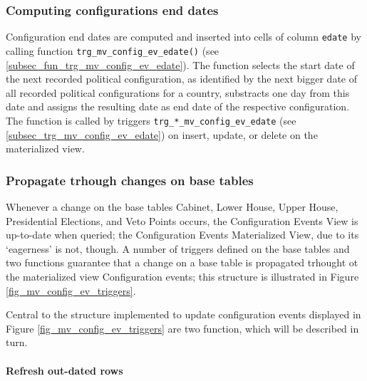 \subsubsection{Computing configurations end dates}
Configuration end dates are computed and inserted into cells of column \texttt{edate} by calling function \texttt{trg\_mv\_config\_ev\_edate()} (see \ref{subsec_fun_trg_mv_config_ev_edate}).
The function selects the start date of the next recorded political configuration, as identified by the next bigger date of all recorded political configurations for a country, substracts one day from this date and assigns the resulting date as end date of the respective configuration.
The function is called by triggers \texttt{trg\_*\_mv\_config\_ev\_edate} (see \ref{subsec_trg_mv_config_ev_edate}) on insert, update, or delete on the materialized view.

\subsubsection{Propagate trhough changes on base tables}\label{subsubsec_trigger_structure_mv_config_ev}

Whenever a change on the base tables Cabinet, Lower House, Upper House, Presidential Elections, and Veto Points occurs, the Configuration Events View is up-to-date when queried; the Configuration Events Materialized View, due to its `eagerness' is not, though.
A number of triggers defined on the base tables and two functions guarantee that a change on a base table is propagated trhought ot the materialized view Configuration events; this structure is illustrated in Figure \ref{fig_mv_config_ev_triggers}.

\label{fig_mv_config_ev_triggers}

Central to the structure implemented to update configuration events displayed in Figure \ref{fig_mv_config_ev_triggers} are two function, which will be described in turn.

\paragraph{Refresh out-dated rows}

